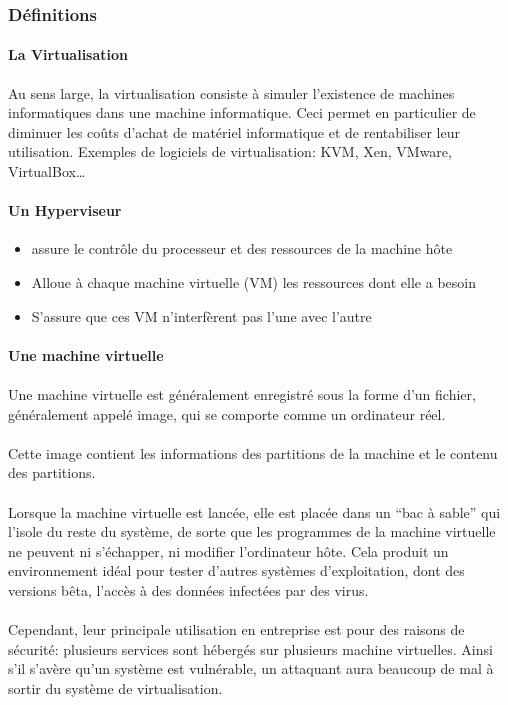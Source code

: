 \subsubsection*{Définitions}

\paragraph{La Virtualisation} Au sens large, la virtualisation consiste à
simuler l'existence de machines informatiques dans une machine informatique.
Ceci permet en particulier de diminuer les coûts d'achat de matériel
informatique et de rentabiliser leur utilisation. Exemples de logiciels de
virtualisation: KVM, Xen, VMware, VirtualBox\ldots

\paragraph{Un Hyperviseur}
\begin{itemize}
	\item assure le contrôle du processeur et des ressources de la machine hôte
	\item Alloue à chaque machine virtuelle (VM) les ressources dont elle a besoin
	\item S'assure que ces VM n'interfèrent pas l'une avec l'autre
\end{itemize}

\paragraph{Une machine virtuelle}

\paragraph{} Une machine virtuelle est généralement enregistré sous la forme
d'un fichier, généralement appelé image, qui se comporte comme un ordinateur
réel.

\paragraph{} Cette image contient les informations des partitions de la machine
et le contenu des partitions.

\paragraph{} Lorsque la machine virtuelle est lancée, elle est placée dans un
``bac à sable'' qui l’isole du reste du système, de sorte que les programmes de
la machine virtuelle ne peuvent ni s’échapper, ni modifier l'ordinateur hôte.
Cela produit un environnement idéal pour tester d'autres systèmes
d’exploitation, dont des versions bêta, l’accès à des données infectées par des
virus.

\paragraph{} Cependant, leur principale utilisation en entreprise est pour des
raisons de sécurité: plusieurs services sont hébergés sur plusieurs machine
virtuelles. Ainsi s'il s'avère qu'un système est vulnérable, un attaquant aura
beaucoup de mal à sortir du système de virtualisation.
